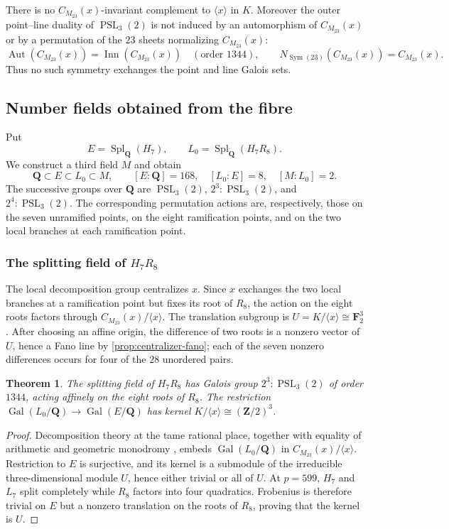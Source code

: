 \documentclass[11pt]{amsart}
\newtheorem{theorem}{Theorem}[section]
\theoremstyle{definition}
\theoremstyle{remark}
\newcommand{\QQ}{\mathbf Q}
\newcommand{\ZZ}{\mathbf Z}
\newcommand{\FF}{\mathbf F}
\newcommand{\Gal}{\operatorname{Gal}}
\newcommand{\PSL}{\operatorname{PSL}}
\newcommand{\Spl}{\operatorname{Spl}}
\newcommand{\Sym}{\operatorname{Sym}}
\newcommand{\Aut}{\operatorname{Aut}}
\newcommand{\Inn}{\operatorname{Inn}}
\newcommand{\Cx}{C_{M_{23}}(x)}
\begin{document}
There is no $\Cx$-invariant complement to $\langle x\rangle$ in $K$.
Moreover the outer point--line duality of $\PSL_3(2)$ is not induced by an
automorphism of $\Cx$ or by a permutation of the $23$ sheets normalizing
$\Cx$:
\[
 \Aut(\Cx)=\Inn(\Cx)\quad(\text{order }1344),
 \qquad N_{\Sym(23)}(\Cx)=\Cx.
\]
Thus no such symmetry exchanges the point and line Galois sets.

\subsection{Number fields obtained from the fibre}
\label{sec:field}

Put
\[
 E=\Spl_{\QQ}(H_7),\qquad L_0=\Spl_{\QQ}(H_7R_8).
\]
We construct a third field $M$ and obtain
\[
 \QQ\subset E\subset L_0\subset M,
 \qquad [E:\QQ]=168,\quad[L_0:E]=8,\quad[M:L_0]=2.
\]
The successive groups over $\QQ$ are $\PSL_3(2)$,
$2^3{:}\PSL_3(2)$, and $2^4{:}\PSL_3(2)$.  The corresponding permutation
actions are, respectively, those on the seven unramified points, on the
eight ramification points, and on the two local branches at each
ramification point.

\subsubsection{The splitting field of \texorpdfstring{$H_7R_8$}{H7R8}}

The local decomposition group centralizes $x$.  Since $x$ exchanges the two
local branches at a ramification point but fixes its root of $R_8$, the
action on the eight roots factors through $\Cx/\langle x\rangle$.  The
translation subgroup is $U=K/\langle x\rangle\cong\FF_2^3$.
After choosing an affine origin, the difference of two roots is a nonzero
vector of $U$, hence a Fano line by \cref{prop:centralizer-fano}; each of the
seven nonzero differences occurs for four of the $28$ unordered pairs.

\begin{theorem}\label{thm:affine}
The splitting field of $H_7R_8$ has Galois group
$2^3{:}\PSL_3(2)$ of order $1344$, acting affinely on the eight roots of
$R_8$.  The restriction $\Gal(L_0/\QQ)\to\Gal(E/\QQ)$ has kernel
$K/\langle x\rangle\cong(\ZZ/2)^3$.
\end{theorem}

\begin{proof}
Decomposition theory at the tame rational place, together with equality of
arithmetic and geometric monodromy \cite{HJLPPZ}, embeds
$\Gal(L_0/\QQ)$ in $\Cx/\langle x\rangle$.  Restriction to $E$ is
surjective, and its kernel is a submodule of the irreducible
three-dimensional module $U$, hence either trivial or all of $U$.  At
$p=599$, $H_7$ and $L_7$ split completely while $R_8$ factors into four
quadratics.  Frobenius is therefore trivial on $E$ but a nonzero translation
on the roots of $R_8$, proving that the kernel is $U$.
\end{proof}
\end{document}
